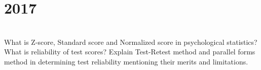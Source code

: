 \section*{2017}
\vspace{-.5cm}
\hrulefill \smallskip\\
 What is Z-score, Standard score and Normalized score in psychological statistics?
\myline
{} What is reliability of test scores? Explain Test-Retest method and parallel forms method in determining test reliability mentioning their merits and limitations.
